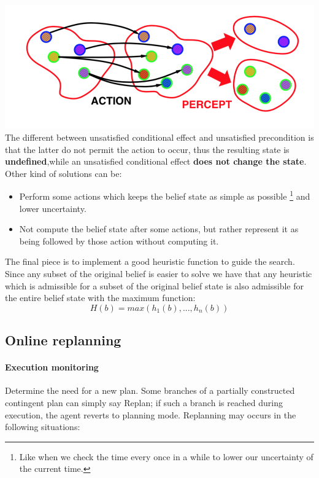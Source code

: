 \documentclass[5pt,a4paper]{article}
\begin{document}
\begin{itemize}
\includegraphics[scale=0.70]{images/belief_state.png}
The different between unsatisfied conditional effect and unsatisfied precondition is that the latter do not permit the action to occur, thus the resulting state is \textbf{undefined},while an unsatisfied conditional effect \textbf{does not change the state}.\\
Other kind of solutions can be:
\begin{itemize}
\item Perform some actions which keeps the belief state as simple as possible \footnote{Like when we check the time every once in a while to lower our uncertainty of the current time.} and lower uncertainty.
\item Not compute the belief state after some actions, but rather represent it as being followed by those action without computing it.
\end{itemize}
The final piece is to implement a good heuristic function to guide the search. Since any subset of the original belief is easier to solve we have that any heuristic which is admissible for a subset of the original belief state is also admissible for the entire belief state with the maximum function:
\[H(b)=max(h_1(b),...,h_n(b))\]



\subsection{Online replanning}

\paragraph{Execution monitoring}

Determine the need for a new plan. Some branches of a partially constructed contingent plan can simply say Replan; if such a branch is reached during execution, the agent reverts to planning mode. Replanning may occurs in the following situations:


\end{itemize}
\end{document}
